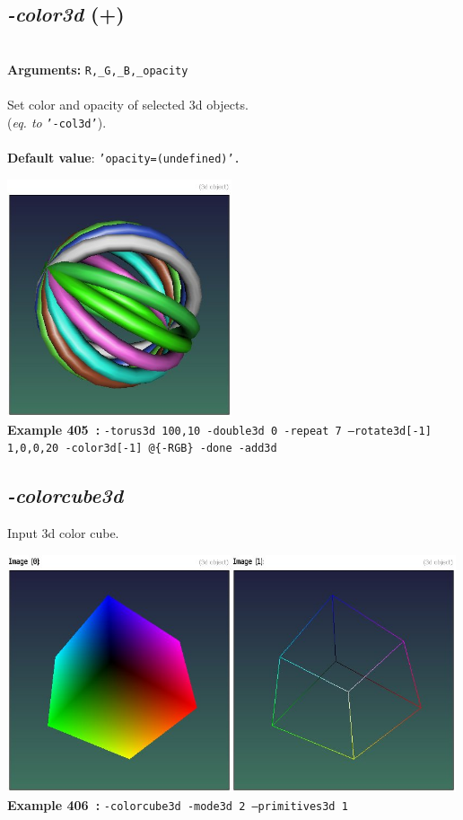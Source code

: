 \documentclass[a4paper,11pt,twoside]{book}
\begin{document}
\subsection{\emph{-color3d} (+)}\vspace*{-0.5em}
~\\\textbf{Arguments: } 
{\small \texttt{R,\_G,\_B,\_opacity}}\\~\\
Set color and opacity of selected 3d objects.
~\\(\emph{eq. to} {\small \texttt{'-col3d'}}).
~\\~\\\textbf{Default value}: {\small \texttt{'opacity=(undefined)'.}}
\begin{center}\includegraphics[keepaspectratio=true,height=7cm,width=\textwidth]{img/gmic_def405.jpg}\\
{\footnotesize \textbf{Example 405~:} \texttt{-torus3d 100,10 -double3d 0 -repeat 7 --rotate3d[-1] 1,0,0,20 -color3d[-1] @\{-RGB\} -done -add3d}}
\end{center}

\subsection{\emph{-colorcube3d} }\vspace*{-0.5em}
Input 3d color cube.
\begin{center}\includegraphics[keepaspectratio=true,height=7cm,width=\textwidth]{img/gmic_def406.jpg}\\
{\footnotesize \textbf{Example 406~:} \texttt{-colorcube3d -mode3d 2 --primitives3d 1}}
\end{center}
\end{document}
